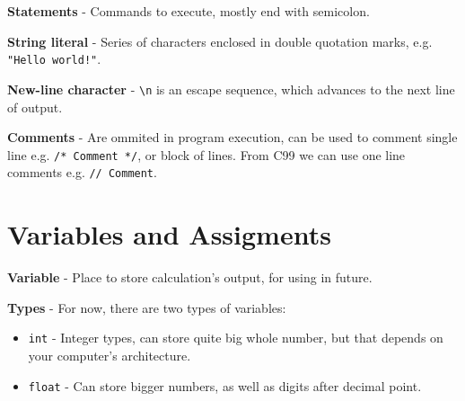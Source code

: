 \documentclass[12pt, openany]{book}
\begin{document}
    \textbf{Statements} - Commands to execute, mostly end with semicolon.

    \bigskip
    \textbf{String literal} - Series of characters enclosed in double quotation marks,
    e.g. \texttt{"Hello world!"}.

    \textbf{New-line character} - \texttt{\textbackslash n} is an escape sequence, which
    advances to the next line of output.

    \textbf{Comments} - Are ommited in program execution, can be used to comment single line
    e.g. \texttt{/* Comment */}, or block of lines. From C99 we can use one line comments
    e.g. \texttt{// Comment}.

    \section{Variables and Assigments}

    \textbf{Variable} - Place to store calculation's output, for using in future.
    \smallskip

    \textbf{Types} - For now, there are two types of variables:
    \begin{itemize}
        \item \texttt{int} - Integer types, can store quite big whole number, but
        that depends on your computer's architecture.
        \item \texttt{float} - Can store bigger numbers, as well as digits after
        decimal point.
    \end{itemize}

       
\end{document}
